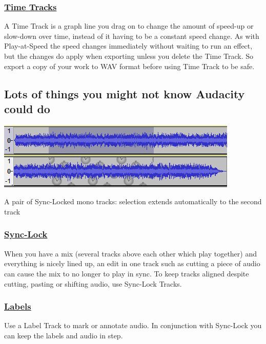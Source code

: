 \documentclass[letterpaper]{article}
\begin{document}
\subsubsection[Time
Tracks]{\href{https://manual.audacityteam.org/man/time_tracks.html}{\textcolor[rgb]{0.3529412,0.21176471,0.5882353}{Time
Tracks}}}
{\color{black}
A Time Track is a graph line you drag on to change the amount of speed-up or slow-down over time, instead of it having
to be a constant speed change. As with Play-at-Speed the speed changes immediately without waiting to run an effect,
but the changes do apply when exporting unless you delete the Time Track. So export a copy of your work to WAV format
before using Time Track to be safe.}

\subsection[Lots of things you might not know Audacity could do]{\color{black} Lots of things you might not know
Audacity could do}
 \includegraphics[width=11.509cm,height=3.201cm]{TourGuide-img016.png} 

A pair of Sync-Locked mono tracks: selection extends automatically to the second track

\subsubsection[Sync{}-Lock]{\href{https://manual.audacityteam.org/man/sync_locked_track_groups.html}{\textcolor[rgb]{0.3529412,0.21176471,0.5882353}{Sync-Lock}}}
{\color{black}
When you have a mix (several tracks above each other which play together) and everything is nicely lined up, an edit in
one track such as cutting a piece of audio can cause the mix to no longer to play in sync. To keep tracks aligned
despite cutting, pasting or shifting audio, use Sync-Lock Tracks.}

\subsubsection[Labels]{\href{https://manual.audacityteam.org/man/label_tracks.html}{\textcolor[rgb]{0.3529412,0.21176471,0.5882353}{Labels}}}
{\color{black}
Use a Label Track to mark or annotate audio. In conjunction with Sync-Lock you can keep the labels and audio in step.}
\end{document}
